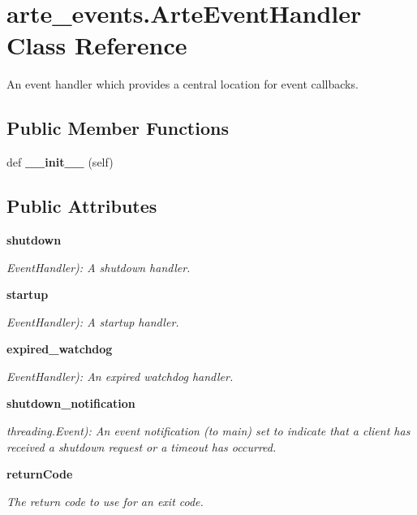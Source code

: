 \section{arte\+\_\+events.\+Arte\+Event\+Handler Class Reference}
\label{classarte__events_1_1_arte_event_handler}


An event handler which provides a central location for event callbacks.  


\subsection*{Public Member Functions}
\begin{DoxyCompactItemize}
\item 
def {\bfseries \+\_\+\+\_\+init\+\_\+\+\_\+} (self)\label{classarte__events_1_1_arte_event_handler_af535e4b9e54118d42a007c8a94722b48}

\end{DoxyCompactItemize}
\subsection*{Public Attributes}
\begin{DoxyCompactItemize}
\item 
{\bf shutdown}
\begin{DoxyCompactList}\small\item\em Event\+Handler)\+: A shutdown handler. \end{DoxyCompactList}\item 
{\bf startup}
\begin{DoxyCompactList}\small\item\em Event\+Handler)\+: A startup handler. \end{DoxyCompactList}\item 
{\bf expired\+\_\+watchdog}
\begin{DoxyCompactList}\small\item\em Event\+Handler)\+: An expired watchdog handler. \end{DoxyCompactList}\item 
{\bf shutdown\+\_\+notification}
\begin{DoxyCompactList}\small\item\em threading.\+Event)\+: An event notification (to main) set to indicate that a client has received a shutdown request or a timeout has occurred. \end{DoxyCompactList}\item 
{\bf return\+Code}
\begin{DoxyCompactList}\small\item\em The return code to use for an exit code. \end{DoxyCompactList}\end{DoxyCompactItemize}


